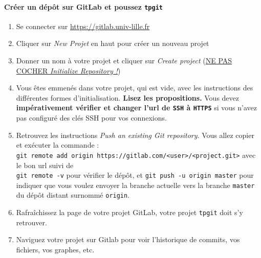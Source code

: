 \documentclass[final, a4paper, openbib, ]{article}
\begin{document}
\paragraph{Créer un dépôt sur GitLab et poussez \texttt{tpgit}}
\begin{enumerate}
\item Se connecter sur \url{https://gitlab.univ-lille.fr}
\item Cliquer sur \textit{New Projet} en haut pour créer un nouveau projet
\item Donner un nom à votre projet et cliquer sur \textit{Create project} (\underline{NE PAS COCHER \textit{Initialize Repository !}})
\item Vous êtes emmenés dans votre projet, qui est vide, avec les instructions des différentes formes d'initialisation.
\textbf{Lisez les propositions.}
Vous devez \textbf{impérativement vérifier et changer l'url de \texttt{SSH} à \texttt{HTTPS}} si vous n'avez pas configuré des clés SSH pour vos connexions.
\item Retrouvez les instructions \textit{Push an existing Git repository}. Vous allez copier et exécuter la commande :\\ \texttt{git remote add origin https://gitlab.com/<user>/<project.git>} avec le bon url suivi de\\ \texttt{git remote -v} pour vérifier le dépôt, et \texttt{git push -u origin master} pour indiquer que vous voulez envoyer la branche actuelle vers la branche \texttt{master} du dépôt distant surnommé \texttt{origin}.
\item Rafraîchissez la page de votre projet GitLab, votre projet \texttt{tpgit} doit s'y retrouver.
\item Naviguez votre projet sur Gitlab pour voir l'historique de commits, vos fichiers, vos graphes, etc.
\end{enumerate}	
\end{document}
